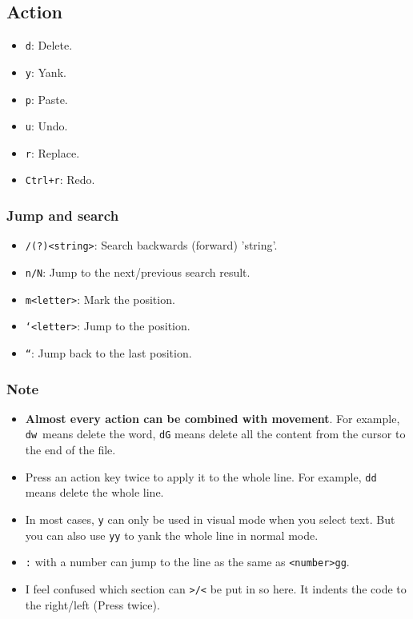 \documentclass[12pt]{ctexart}
\begin{document}
\subsection*{\textbf{Action}}

\begin{itemize}[itemsep=0pt, parsep=0pt, topsep=0pt, partopsep=0pt]
\item \texttt{d}: Delete.
\item \texttt{y}: Yank.
\item \texttt{p}: Paste.
\item \texttt{u}: Undo.
\item \texttt{r}: Replace.
\item \texttt{Ctrl+r}: Redo.
\end{itemize}

\subsubsection*{\textbf{Jump and search}}

\begin{itemize}[itemsep=0pt, parsep=0pt, topsep=0pt, partopsep=0pt]
\item \texttt{/(?)<string>}: Search backwards (forward) 'string'.
\item \texttt{n/N}: Jump to the next/previous search result.
\item \texttt{m<letter>}: Mark the position.
\item \texttt{`<letter>}: Jump to the position.
\item \texttt{``}: Jump back to the last position.
\end{itemize}

\subsubsection{\textbf{Note}}

\begin{itemize}[itemsep=0pt, parsep=0pt, topsep=0pt, partopsep=0pt]
\item \textbf{Almost every action can be combined with movement}. For example,
\texttt{dw}\ means delete the word, \texttt{dG} means delete all the
content from the cursor to the end of the file.
\item Press an action key twice to apply it to the whole line. For
example, \texttt{dd} means delete the whole line.
\item In most cases, \texttt{y} can only be used in visual mode when you
select text. But you can also use \texttt{yy} to yank the whole line in
normal mode.
\item \texttt{:} with a number can jump to the line as the same as 
\texttt{<number>gg}.
\item I feel confused which section can \texttt{>/<} be put in so here. 
It indents the code to the right/left (Press twice).
\end{itemize}
\end{document}
